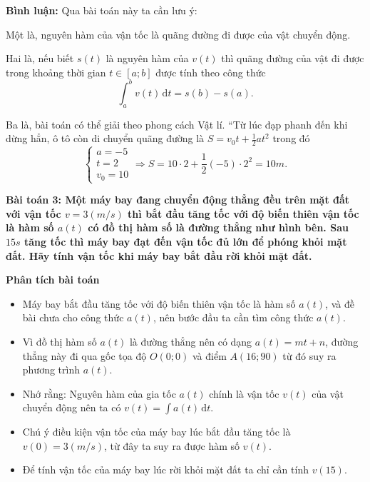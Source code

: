 \documentclass[12pt,a4paper]{article}
\newcommand{\dd}{\,\mathrm{d}}
\newcommand{\analysis}{\noindent\raisebox{0.15ex}{\rule{1.6ex}{1.6ex}}\hspace{4pt}\textbf{Phân tích bài toán}\par}
\newcommand{\commenthead}{\textbf{Bình luận:} Qua bài toán này ta cần lưu ý:\par}
\begin{document}
\begin{commentbox}\commenthead
Một là, nguyên hàm của vận tốc là quãng đường đi được của vật chuyển động.

Hai là, nếu biết $s(t)$ là nguyên hàm của $v(t)$ thì quãng đường của vật đi được trong khoảng
thời gian $t\in[a;b]$ được tính theo công thức
\[
\int_a^b v(t)\dd t=s(b)-s(a).
\]

Ba là, bài toán có thể giải theo phong cách Vật lí. “Từ lúc đạp phanh đến khi dừng hẳn, ô
tô còn di chuyển quãng đường là $S=v_0t+\frac12at^2$ trong đó
\[
\begin{cases}a=-5\\t=2\\v_0=10\end{cases}
\Rightarrow S=10\cdot2+\frac12(-5)\cdot2^2=10m.
\]

\end{commentbox}\textbf{Bài toán 3: Một máy bay đang chuyển động thẳng đều trên mặt đất với vận tốc $v=3(m/s)$ thì bắt đầu tăng tốc với độ biến thiên vận tốc là hàm số $a(t)$ có đồ thị hàm số là đường thẳng như hình bên. Sau $15s$ tăng tốc thì máy bay đạt đến vận tốc đủ lớn để phóng khỏi mặt đất. Hãy tính vận tốc khi máy bay bắt đầu rời khỏi mặt đất.}\par\medskip
\begin{analysisbox}
\analysis
\begin{itemize}
\item Máy bay bắt đầu tăng tốc với độ biến thiên vận tốc là hàm số $a(t)$, và đề bài chưa cho
công thức $a(t)$, nên bước đầu ta cần tìm công thức $a(t)$.
\item Vì đồ thị hàm số $a(t)$ là đường thẳng nên có dạng $a(t)=mt+n$, đường thẳng này đi
qua gốc tọa độ $O(0;0)$ và điểm $A(16;90)$ từ đó suy ra phương trình $a(t)$.
\item Nhớ rằng: Nguyên hàm của gia tốc $a(t)$ chính là vận tốc $v(t)$ của vật chuyển động
nên ta có
$\displaystyle v(t)=\int a(t)\dd t$.
\item Chú ý điều kiện vận tốc của máy bay lúc bắt đầu tăng tốc là $v(0)=3(m/s)$, từ đây ta
suy ra được hàm số $v(t)$.
\item Để tính vận tốc của máy bay lúc rời khỏi mặt đất ta chỉ cần tính $v(15)$.
\end{itemize}
\end{analysisbox}
\end{document}
